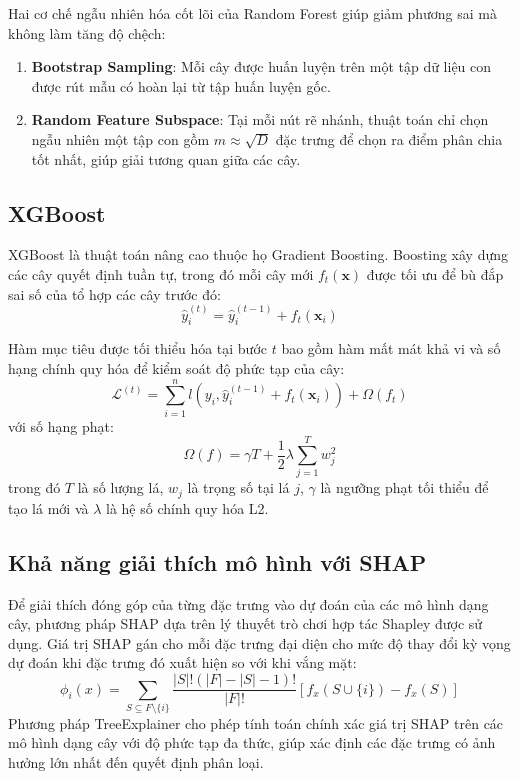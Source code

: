Hai cơ chế ngẫu nhiên hóa cốt lõi của Random Forest giúp giảm phương sai mà không làm tăng độ chệch:
\begin{enumerate}
    \item \textbf{Bootstrap Sampling}: Mỗi cây được huấn luyện trên một tập dữ liệu con được rút mẫu có hoàn lại từ tập huấn luyện gốc.
    \item \textbf{Random Feature Subspace}: Tại mỗi nút rẽ nhánh, thuật toán chỉ chọn ngẫu nhiên một tập con gồm $m \approx \sqrt{D}$ đặc trưng để chọn ra điểm phân chia tốt nhất, giúp giải tương quan giữa các cây.
\end{enumerate}

\subsection{XGBoost}
XGBoost \cite{chen2016xgboost} là thuật toán nâng cao thuộc họ Gradient Boosting. Boosting xây dựng các cây quyết định tuần tự, trong đó mỗi cây mới $f_t(\mathbf{x})$ được tối ưu để bù đắp sai số của tổ hợp các cây trước đó:
\begin{equation}
    \hat{y}_i^{(t)} = \hat{y}_i^{(t-1)} + f_t(\mathbf{x}_i)
\end{equation}

Hàm mục tiêu được tối thiểu hóa tại bước $t$ bao gồm hàm mất mát khả vi và số hạng chính quy hóa để kiểm soát độ phức tạp của cây:
\begin{equation}
    \mathcal{L}^{(t)} = \sum_{i=1}^{n} l\left(y_i, \hat{y}_i^{(t-1)} + f_t(\mathbf{x}_i)\right) + \Omega(f_t)
\end{equation}
với số hạng phạt:
\begin{equation}
    \Omega(f) = \gamma T + \frac{1}{2} \lambda \sum_{j=1}^{T} w_j^2
\end{equation}
trong đó $T$ là số lượng lá, $w_j$ là trọng số tại lá $j$, $\gamma$ là ngưỡng phạt tối thiểu để tạo lá mới và $\lambda$ là hệ số chính quy hóa L2.

\subsection{Khả năng giải thích mô hình với SHAP}
Để giải thích đóng góp của từng đặc trưng vào dự đoán của các mô hình dạng cây, phương pháp SHAP \cite{lundberg2017unified} dựa trên lý thuyết trò chơi hợp tác Shapley được sử dụng. Giá trị SHAP gán cho mỗi đặc trưng đại diện cho mức độ thay đổi kỳ vọng dự đoán khi đặc trưng đó xuất hiện so với khi vắng mặt:
\begin{equation}
    \phi_i(x) = \sum_{S \subseteq F \setminus \{i\}} \frac{|S|!(|F| - |S| - 1)!}{|F|!} \left[ f_x(S \cup \{i\}) - f_x(S) \right]
\end{equation}
Phương pháp TreeExplainer cho phép tính toán chính xác giá trị SHAP trên các mô hình dạng cây với độ phức tạp đa thức, giúp xác định các đặc trưng có ảnh hưởng lớn nhất đến quyết định phân loại.

